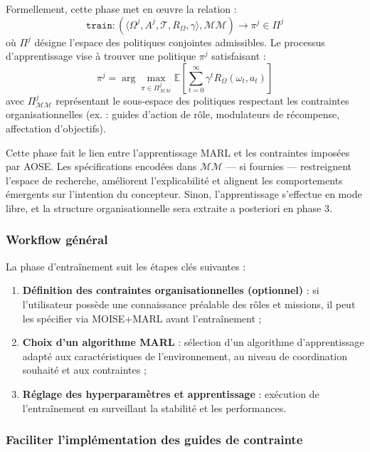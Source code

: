 \documentclass[pdflatex,sn-mathphys-num]{sn-jnl}%
\theoremstyle{thmstyleone}%
\theoremstyle{thmstyletwo}%
\theoremstyle{thmstylethree}%
\begin{document}
Formellement, cette phase met en œuvre la relation :
\[
    \texttt{train}: \left( \langle \Omega^j, A^j, \mathcal{T}, R_{\Omega}, \gamma \rangle, \mathcal{MM} \right) \longrightarrow \pi^j \in \Pi^j
\]
où $\Pi^j$ désigne l'espace des politiques conjointes admissibles. Le processus d'apprentissage vise à trouver une politique $\pi^j$ satisfaisant :
\[
    \pi^j = \arg\max_{\pi \in \Pi^j_{\mathcal{MM}}} \mathbb{E} \left[ \sum_{t=0}^{\infty} \gamma^t R_{\Omega}(\omega_t, a_t) \right]
\]
avec $\Pi^j_{\mathcal{MM}}$ représentant le sous-espace des politiques respectant les contraintes organisationnelles (ex. : guides d'action de rôle, modulateurs de récompense, affectation d'objectifs).

Cette phase fait le lien entre l'apprentissage MARL et les contraintes imposées par AOSE. Les spécifications encodées dans $\mathcal{MM}$ — si fournies — restreignent l'espace de recherche, améliorent l'explicabilité et alignent les comportements émergents sur l'intention du concepteur. Sinon, l'apprentissage s'effectue en mode libre, et la structure organisationnelle sera extraite a posteriori en phase 3.

\subsubsection{Workflow général}

La phase d'entraînement suit les étapes clés suivantes :
\begin{enumerate}
    \item \textbf{Définition des contraintes organisationnelles (optionnel)} : si l'utilisateur possède une connaissance préalable des rôles et missions, il peut les spécifier via MOISE+MARL avant l'entraînement ;
          
    \item \textbf{Choix d'un algorithme MARL} : sélection d'un algorithme d'apprentissage adapté aux caractéristiques de l'environnement, au niveau de coordination souhaité et aux contraintes ;
          
    \item \textbf{Réglage des hyperparamètres et apprentissage} : exécution de l'entraînement en surveillant la stabilité et les performances.
\end{enumerate}

\subsubsection{Faciliter l'implémentation des guides de contrainte}
\end{document}

